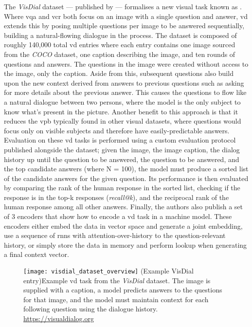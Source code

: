 The \textit{VisDial} dataset --- published by \citeauthor{das_visual_2019} \cite{das_visual_2019} --- formalises a new visual task known as .
Where \gls{vqa} and \gls{vcr} both focus on an image with a single question and answer, \gls{vd} extends this by posing multiple questions per image to be answered sequentially, building a natural-flowing dialogue in the process.
The dataset is composed of roughly 140,000 total \gls{vd} entries where each entry contains one image sourced from the \textit{COCO} dataset\cite{lin_microsoft_2015}, one caption describing the image, and ten rounds of questions and answers.
The questions in the image were created without access to the image, only the caption.
Aside from this, subsequent questions also build upon the new context derived from answers to previous questions such as asking for more details about the previous answer.
This causes the questions to flow like a natural dialogue between two persons, where the model is the only subject to know what's present in the picture.
Another benefit to this approach is that it reduces the \gls{vpb} typically found in other visual datasets, where questions would focus only on visible subjects and therefore have easily-predictable answers.
Evaluation on these \gls{vd} tasks is performed using a custom evaluation protocol published alongside the dataset; given the image, the image caption, the dialog history up until the question to be answered, the question to be answered, and the top candidate answers (where N = 100), the model must produce a sorted list of the candidate answers for the given question.
Its performance is then evaluated by comparing the rank of the human response in the sorted list, checking if the response is in the top-k responses (\textit{recall@k}), and the reciprocal rank of the human response among all other answers.
Finally, the authors also publish a set of 3 encoders that show how to encode a \gls{vd} task in a machine model.
These encoders either embed the data in vector space and generate a joint embedding, use a sequence of \glspl{rnn} with attention-over-history to the question-relevant history, or simply store the data in memory and perform lookup when generating a final context vector.

\begin{figure}[htbp]
    \centering
    \texttt{[image: visdial\_dataset\_overview]}
    \captionsource(Example VisDial entry){Example \gls{vd} task from the \textit{VisDial} dataset. The image is supplied with a caption, a model predicts answers to the questions for that image, and the model must maintain context for each following question using the dialogue history. \label{fig:visdial_question_answer}}{\url{https://visualdialog.org}}
\end{figure}
